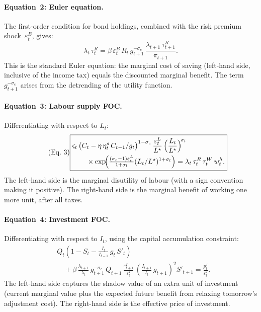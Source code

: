 \documentclass[11pt,a4paper]{article}
\begin{document}
\paragraph{Equation~2: Euler equation.}
The first-order condition for bond holdings, combined with the risk premium
shock~$\varepsilon^B_t$, gives:
\begin{equation}\label{eq:eq2}\tag{Eq.~2}
  \boxed{
  \lambda_t\,\tau^R_t
  = \beta\,\varepsilon^B_t\,R_t\,g_{t+1}^{-\sigma_c}\,
    \frac{\lambda_{t+1}\,\tau^R_{t+1}}{\pi_{t+1}}.}
\end{equation}
This is the standard Euler equation: the marginal cost of saving (left-hand
side, inclusive of the income tax) equals the discounted marginal benefit. The
term $g_{t+1}^{-\sigma_c}$ arises from the detrending of the utility function.

\paragraph{Equation~3: Labour supply FOC.}
Differentiating with respect to $L_t$:
\begin{equation}\label{eq:eq3}\tag{Eq.~3}
  \boxed{
  \begin{aligned}
  &\varsigma_t\,\bigl(C_t - \eta\,\eta^s_t\,C_{t-1}/g_t\bigr)^{1-\sigma_c}
  \,\frac{\varepsilon^L_t}{L^{\star}}
  \,\Bigl(\frac{L_t}{L^{\star}}\Bigr)^{\!\sigma_l} \\
  &\qquad\times \exp\!\Bigl(\tfrac{(\sigma_c-1)\varepsilon^L_t}{1+\sigma_l}
  (L_t/L^{\star})^{1+\sigma_l}\Bigr)
  = \lambda_t\,\tau^R_t\,\tau^W_t\,w^h_t.
  \end{aligned}}
\end{equation}
The left-hand side is the marginal disutility of labour (with a sign
convention making it positive). The right-hand side is the marginal benefit of
working one more unit, after all taxes.

\paragraph{Equation~4: Investment FOC.}
Differentiating with respect to $I_t$, using the capital accumulation
constraint:
\begin{equation}\label{eq:eq4}\tag{Eq.~4}
  \boxed{
  \begin{aligned}
  &Q_t\!\left(1 - S_t - \frac{I_t}{I_{t-1}}\,g_t\,S'_t\right)\\
  &\quad + \beta\,\frac{\lambda_{t+1}}{\lambda_t}\,g_{t+1}^{-\sigma_c}\,
    Q_{t+1}\,\frac{\varepsilon^I_{t+1}}{\varepsilon^I_t}\,
    \left(\frac{I_{t+1}}{I_t}\,g_{t+1}\right)^{\!2}\!S'_{t+1}
  = \frac{p^I_t}{\varepsilon^I_t}.
  \end{aligned}}
\end{equation}
The left-hand side captures the shadow value of an extra unit of investment
(current marginal value plus the expected future benefit from relaxing
tomorrow's adjustment cost). The right-hand side is the effective price of
investment.
\end{document}
